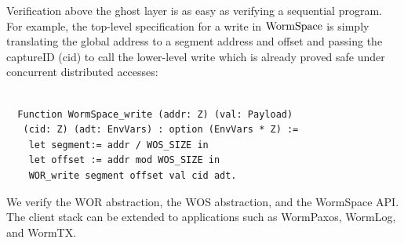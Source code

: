 

Verification above the ghost layer is as easy as verifying a sequential program.
For example, the top-level specification for a write in $\mathrm{WormSpace}$ is simply translating the global address to a segment address and offset and passing the captureID (cid) to call the lower-level write which is already proved safe under concurrent distributed accesses:

\begin{lstlisting}[language=mycoq, basicstyle=\small]%, basicstyle=\linespread{0.5}]

  Function WormSpace_write (addr: Z) (val: Payload)
   (cid: Z) (adt: EnvVars) : option (EnvVars * Z) :=
    let segment:= addr / WOS_SIZE in 
    let offset := addr mod WOS_SIZE in
    WOR_write segment offset val cid adt.
\end{lstlisting}
\noindent We verify the WOR abstraction, the WOS abstraction, and the WormSpace API. The client stack can be extended to applications such as WormPaxos, WormLog, and WormTX. 





